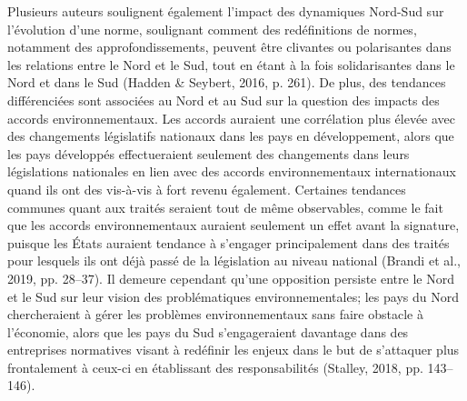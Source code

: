 \documentclass[12pt]{ulaval}
\begin{document}
Plusieurs auteurs soulignent également l'impact des dynamiques Nord-Sud sur l'évolution d'une norme, soulignant comment des redéfinitions de normes, notamment des approfondissements, peuvent être clivantes ou polarisantes dans les relations entre le Nord et le Sud, tout en étant à la fois solidarisantes dans le Nord et dans le Sud (Hadden \& Seybert, 2016, p. 261). De plus, des tendances différenciées sont associées au Nord et au Sud sur la question des impacts des accords environnementaux. Les accords auraient une corrélation plus élevée avec des changements législatifs nationaux dans les pays en développement, alors que les pays développés effectueraient seulement des changements dans leurs législations nationales en lien avec des accords environnementaux internationaux quand ils ont des vis-à-vis à fort revenu également. Certaines tendances communes quant aux traités seraient tout de même observables, comme le fait que les accords environnementaux auraient seulement un effet avant la signature, puisque les États auraient tendance à s'engager principalement dans des traités pour lesquels ils ont déjà passé de la législation au niveau national (Brandi et al., 2019, pp. 28--37). Il demeure cependant qu'une opposition persiste entre le Nord et le Sud sur leur vision des problématiques environnementales; les pays du Nord chercheraient à gérer les problèmes environnementaux sans faire obstacle à l'économie, alors que les pays du Sud s'engageraient davantage dans des entreprises normatives visant à redéfinir les enjeux dans le but de s'attaquer plus frontalement à ceux-ci en établissant des responsabilités (Stalley, 2018, pp. 143--146).
\end{document}
